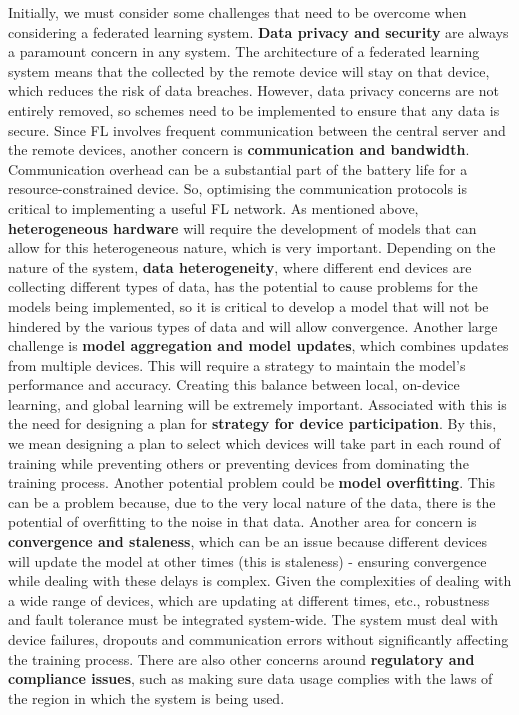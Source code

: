 \documentclass[conference]{IEEEtran}
\begin{document}
Initially, we must consider some challenges that need to be overcome when considering a federated learning system. \textbf{Data privacy and security} are always a paramount concern in any system. The architecture of a federated learning system means that the collected by the remote device will stay on that device, which reduces the risk of data breaches. However, data privacy concerns are not entirely removed, so schemes need to be implemented to ensure that any data is secure. Since FL involves frequent communication between the central server and the remote devices, another concern is \textbf{communication and bandwidth}. Communication overhead can be a substantial part of the battery life for a resource-constrained device. So, optimising the communication protocols is critical to implementing a useful FL network. As mentioned above, \textbf{heterogeneous hardware} will require the development of models that can allow for this heterogeneous nature, which is very important. Depending on the nature of the system, \textbf{data heterogeneity}, where different end devices are collecting different types of data, has the potential to cause problems for the models being implemented, so it is critical to develop a model that will not be hindered by the various types of data and will allow convergence. Another large challenge is \textbf{model aggregation and model updates}, which combines updates from multiple devices. This will require a strategy to maintain the model's performance and accuracy. Creating this balance between local, on-device learning, and global learning will be extremely important. Associated with this is the need for designing a plan for \textbf{strategy for device participation}. By this, we mean designing a plan to select which devices will take part in each round of training while preventing others or preventing devices from dominating the training process. Another potential problem could be \textbf{model overfitting}. This can be a problem because, due to the very local nature of the data, there is the potential of overfitting to the noise in that data. Another area for concern is \textbf{convergence and staleness}, which can be an issue because different devices will update the model at other times (this is staleness) - ensuring convergence while dealing with these delays is complex. Given the complexities of dealing with a wide range of devices, which are updating at different times, etc., robustness and fault tolerance must be integrated system-wide. The system must deal with device failures, dropouts and communication errors without significantly affecting the training process. There are also other concerns around \textbf{regulatory and compliance issues}, such as making sure data usage complies with the laws of the region in which the system is being used. \\
\end{document}
